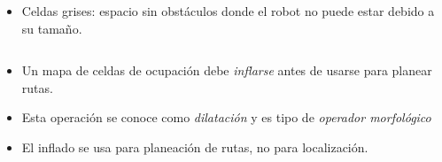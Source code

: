 \begin{frame}
\begin{columns}
\begin{column}{0.4\textwidth}
\begin{itemize}
        \item Celdas grises: espacio sin obstáculos donde el robot no puede estar debido a su tamaño. 
      \end{itemize}
    \end{column}
  \end{columns}
  \begin{itemize}
  \item Un mapa de celdas de ocupación debe \textit{inflarse} antes de usarse para planear rutas.
  \item Esta operación se conoce como \textit{dilatación} y es tipo de \textit{operador morfológico}
  \item El inflado se usa para planeación de rutas, no para localización.
  \end{itemize}
\end{frame}

